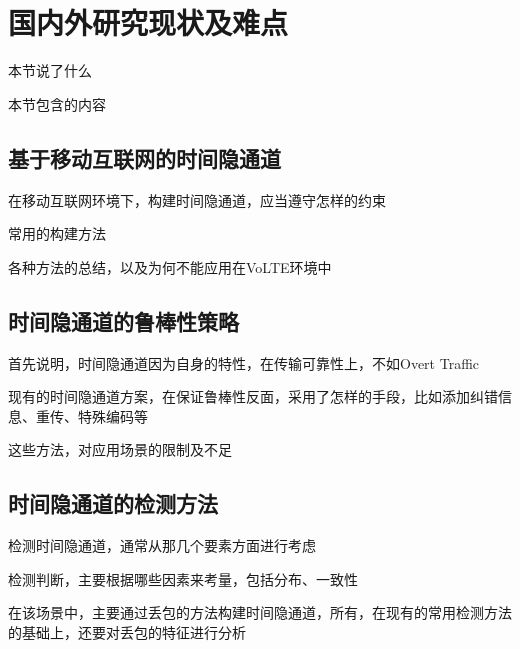 \section{国内外研究现状及难点}
\label{sec:intro:background}

本节说了什么

本节包含的内容

\subsection{基于移动互联网的时间隐通道}
\label{sec:intro:background:ctc}

在移动互联网环境下，构建时间隐通道，应当遵守怎样的约束

常用的构建方法

各种方法的总结，以及为何不能应用在VoLTE环境中

\subsection{时间隐通道的鲁棒性策略}
\label{sec:intro:background:robustness}

首先说明，时间隐通道因为自身的特性，在传输可靠性上，不如Overt Traffic

现有的时间隐通道方案，在保证鲁棒性反面，采用了怎样的手段，比如添加纠错信息、重传、特殊编码等

这些方法，对应用场景的限制及不足

\subsection{时间隐通道的检测方法}
\label{sec:intro:background:detect}

检测时间隐通道，通常从那几个要素方面进行考虑

检测判断，主要根据哪些因素来考量，包括分布、一致性

在该场景中，主要通过丢包的方法构建时间隐通道，所有，在现有的常用检测方法的基础上，还要对丢包的特征进行分析



